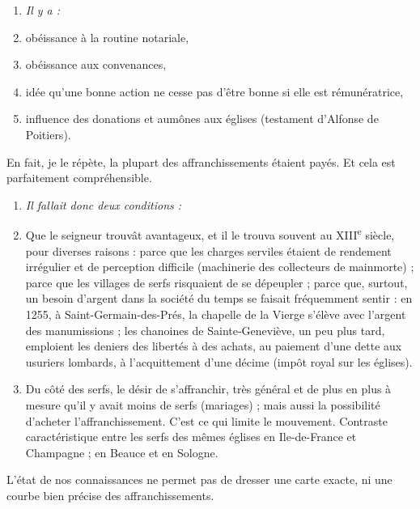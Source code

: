 \documentclass[french,twoside]{book} %
\newlength{\listmod}
\newcommand{\listhead}[1]{\hspace{-1\listmod}\emph{#1}}
\begin{document}
\begin{enumerate}[itemsep=0pt,]
\item[]\listhead{Il y a :}
\item obéissance à la routine notariale,
\item obéissance aux convenances,
\item idée qu’une bonne action ne cesse pas d’être bonne si elle est rémunératrice,
\item influence des donations et aumônes aux églises (testament d’Alfonse de Poitiers).

\end{enumerate}\noindent En fait, je le répète, la plupart des affranchissements étaient payés. Et cela est parfaitement compréhensible.\par

\begin{enumerate}[itemsep=0pt,]
\item[]\listhead{Il fallait donc deux conditions :}
\item Que le seigneur trouvât avantageux, et il le trouva souvent au XIII\textsuperscript{e} siècle, pour diverses raisons : parce que les charges serviles étaient de rendement irrégulier et de perception difficile (machinerie  
\label{p61} des collecteurs de mainmorte) ; parce que les villages de serfs risquaient de se dépeupler ; parce que, surtout, un besoin d’argent dans la société du temps se faisait fréquemment sentir : en 1255, à Saint-Germain-des-Prés, la chapelle de la Vierge s’élève avec l’argent des manumissions ; les chanoines de Sainte-Geneviève, un peu plus tard, emploient les deniers des libertés à des achats, au paiement d’une dette aux usuriers lombards, à l’acquittement d’une décime (impôt royal sur les églises).
\item Du côté des serfs, le désir de s’affranchir, très général et de plus en plus à mesure qu’il y avait moins de serfs (mariages) ; mais aussi la possibilité d’acheter l’affranchissement. C’est ce qui limite le mouvement. Contraste caractéristique entre les serfs des mêmes églises en Ile-de-France et Champagne ; en Beauce et en Sologne.

\end{enumerate}\noindent L’état de nos connaissances ne permet pas de dresser une carte exacte, ni une courbe bien précise des affranchissements.\par
\end{document}

